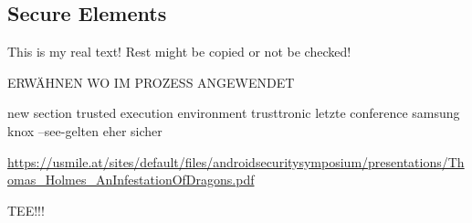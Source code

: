 \subsection{Secure Elements}\label{subsection:counter-external-secure}
This is my real text! Rest might be copied or not be checked!


ERWÄHNEN WO IM PROZESS ANGEWENDET\newline

new section trusted execution environment
trusttronic letzte conference
samsung knox
--see-gelten eher sicher

\url{https://usmile.at/sites/default/files/androidsecuritysymposium/presentations/Thomas_Holmes_AnInfestationOfDragons.pdf}


TEE!!!

